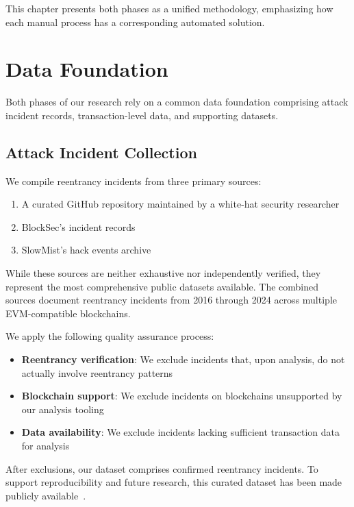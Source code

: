 This chapter presents both phases as a unified methodology, emphasizing how each manual process has a corresponding automated solution.

\section{Data Foundation}
\label{sec:meth-data}

Both phases of our research rely on a common data foundation comprising attack incident records, transaction-level data, and supporting datasets.

\subsection{Attack Incident Collection}
\label{sec:meth-collection}

We compile reentrancy incidents from three primary sources:
\begin{enumerate}
    \item A curated GitHub repository maintained by a white-hat security researcher~\cite{reentrancy-list-pcaversaccio}
    \item BlockSec's incident records~\cite{blocksec-security-incidents}
    \item SlowMist's hack events archive~\cite{slowmist-hacked}
\end{enumerate}

While these sources are neither exhaustive nor independently verified, they represent the most comprehensive public datasets available. The combined sources document reentrancy incidents from 2016 through 2024 across multiple EVM-compatible blockchains.

We apply the following quality assurance process:
\begin{itemize}
    \item \textbf{Reentrancy verification}: We exclude incidents that, upon analysis, do not actually involve reentrancy patterns
    \item \textbf{Blockchain support}: We exclude incidents on blockchains unsupported by our analysis tooling
    \item \textbf{Data availability}: We exclude incidents lacking sufficient transaction data for analysis
\end{itemize}

After exclusions, our dataset comprises  confirmed reentrancy incidents. To support reproducibility and future research, this curated dataset has been made publicly available~\cite{our-dataset}.

